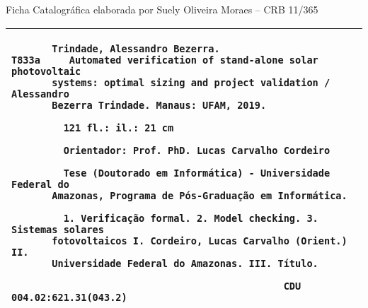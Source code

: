 \thispagestyle{plain}
%    
%    
%    
%
%
\thispagestyle{empty}
\null\vfill

\begin{center}
Ficha Catalográfica elaborada por Suely Oliveira Moraes – CRB 11/365
\begin{tabular}{|p{14.5cm}|}%
\hline
\begin{small}
\begin{verbatim}
       Trindade, Alessandro Bezerra.
T833a     Automated verification of stand-alone solar photovoltaic 
       systems: optimal sizing and project validation / Alessandro 
       Bezerra Trindade. Manaus: UFAM, 2019.

         121 fl.: il.: 21 cm 

         Orientador: Prof. PhD. Lucas Carvalho Cordeiro

         Tese (Doutorado em Informática) - Universidade Federal do
       Amazonas, Programa de Pós-Graduação em Informática. 

         1. Verificação formal. 2. Model checking. 3. Sistemas solares
       fotovoltaicos I. Cordeiro, Lucas Carvalho (Orient.) II. 
       Universidade Federal do Amazonas. III. Título.

                                               CDU 004.02:621.31(043.2)
\end{verbatim}
\end{small}
\\ \hline
\end{tabular}
\end{center}

\thispagestyle{plain}